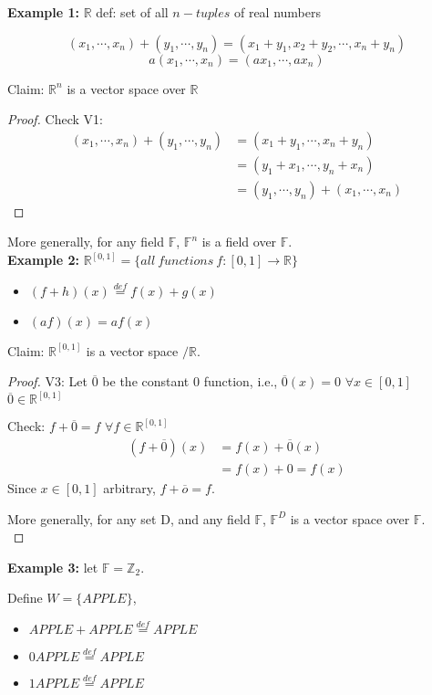 \documentclass[12pt]{article}
\begin{document}
	\newpage
	{\color{Brown}
	\textbf{Example 1:}
		$\mathbb{R}$ def: set of all $n-tuples$ of real numbers
		
		\[
			(x_1,\cdots, x_n)+(y_1, \cdots, y_n)=
			(x_1+y_1,x_2+y_2,\cdots,x_n+y_n)
		\]
		\[
			a(x_1,\cdots, x_n) = (ax_1,\cdots, ax_n)
		\]

		Claim: $\mathbb{R}^n$ is a vector space over $\mathbb{R}$
	\begin{proof}
		Check V1: 
		\begin{align*}
			(x_1, \cdots, x_n)+(y_1,\cdots, y_n) 
			&= (x_1+y_1,\cdots, x_n+y_n)\\
			&= (y_1+x_1,\cdots, y_n+x_n)\\
			&= (y_1,\cdots, y_n) + (x_1, \cdots, x_n)	
		\end{align*}
	\end{proof}

	More generally, for any field $\mathbb{F}$, $\mathbb{F}^n$ is a field over
	$\mathbb{F}$.\\

	\textbf{Example 2:}
	$\mathbb{R}^{[0,1]} =\{all\ functions \ f:[0,1] \to \mathbb{R}\}$
	\begin{itemize}
		\item $(f+h)(x) \overset{def}{=} f(x)+g(x)$
		\item $(af)(x) = af(x)$ 
	\end{itemize}

	Claim: $\mathbb{R}^[0,1]$ is a vector space $/ \mathbb{R}$.
	\begin{proof}
		V3: Let $\overline{0}$ be the constant 0 function, 
		i.e., $\overline{0}(x) = 0$ $\forall x\in [0,1]$
		$\overline{0} \in \mathbb{R} ^{[0,1]}$

		Check: $f+\overline{0} = f$ $\forall f \in \mathbb{R}^{[0,1]}$
		\begin{align*}
			(f+\overline{0})(x) &= f(x) +\overline{0}(x) \\
			&= f(x) + 0 = f(x)
		\end{align*}
		Since $x\in [0,1] $ arbitrary, $f+\overline{o}=f$. 

		More generally, for any set D, and any field $\mathbb{F}$, 
		$\mathbb{F}^D$ is a vector space over $\mathbb{F}$.\\
	\end{proof}

	\textbf{Example 3: }
	let $\mathbb{F} = \mathbb{Z}_2$. 

	Define $W=\{APPLE\}$, 
	\begin{itemize}
		\item $APPLE + APPLE \overset{def}{=} APPLE$
		\item $0APPLE \overset{def}{=} APPLE$
		\item $1APPLE \overset{def}{=} APPLE$
	\end{itemize}

}
\end{document}
